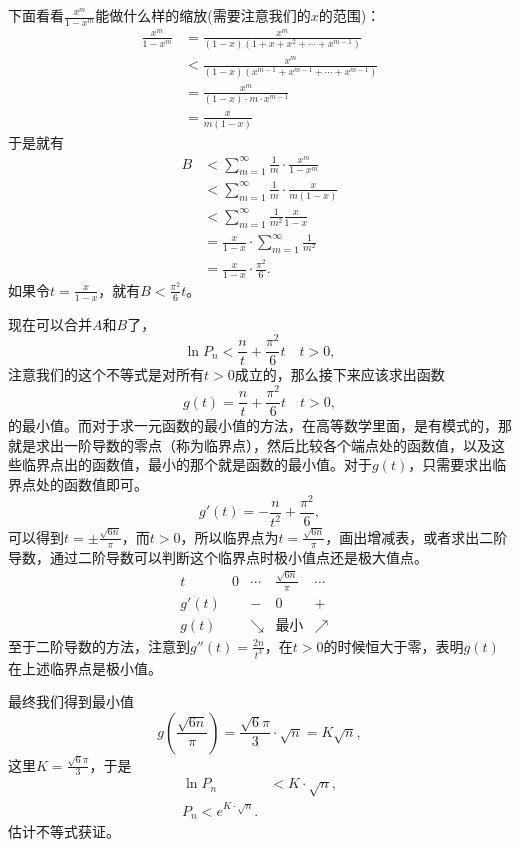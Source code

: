 \documentclass[cn]{elegantbook}
\begin{document}
下面看看$\frac{x^m}{1-x^m}$能做什么样的缩放(需要注意我们的$x$的范围)：
\[
\begin{aligned}
\frac{x^m}{1-x^m} &= \frac{x^m}{(1-x)(1+x+x^2+\cdots+x^{m-1})} \\
& < \frac{x^m}{(1-x)(x^{m-1} + x^{m-1} + \cdots + x^{m-1})} \\
&= \frac{x^m}{(1-x)\cdot m \cdot x^{m-1}} \\
&= \frac{x}{m(1-x)}
\end{aligned}
\]
于是就有
\[
\begin{aligned}
B &< \sum_{m=1}^{\infty}{\frac{1}{m} \cdot \frac{x^m}{1 - x^m}} \\
& < \sum_{m=1}^{\infty}{\frac{1}{m} \cdot \frac{x}{m(1-x)}}\\
& < \sum_{m=1}^{\infty}{\frac{1}{m^2}\frac{x}{1-x}} \\
&= \frac{x}{1-x} \cdot \sum_{m=1}^{\infty}{\frac{1}{m^2}} \\
&= \frac{x}{1-x} \cdot \frac{\pi^2}{6}.
\end{aligned}
\]
如果令$t = \frac{x}{1-x}$，就有$B < \frac{\pi^2}{6}t$。

现在可以合并$A$和$B$了，
\[
\ln{P_n} < \frac{n}{t} + \frac{\pi^2}{6}t \quad t > 0,
\]
注意我们的这个不等式是对所有$t > 0$成立的，那么接下来应该求出函数
\[
g(t) = \frac{n}{t} + \frac{\pi^2}{6}t \quad t > 0,
\]
的最小值。而对于求一元函数的最小值的方法，在高等数学里面，是有模式的，那就是求出一阶导数的零点（称为临界点），然后比较各个端点处的函数值，以及这些临界点出的函数值，最小的那个就是函数的最小值。对于$g(t)$，只需要求出临界点处的函数值即可。
\[
g'(t) = -\frac{n}{t^2} + \frac{\pi^2}{6},
\]
可以得到$t = \pm\frac{\sqrt{6n}}{\pi}$，而$t > 0$，所以临界点为$t = \frac{\sqrt{6n}}{\pi}$，画出增减表，或者求出二阶导数，通过二阶导数可以判断这个临界点时极小值点还是极大值点。
\[
\begin{array}{c||c|c|c|c|c}
t & 0 & \cdots & \frac{\sqrt{6n}}{\pi} & \cdots & \\
\hline
g'(t)&&-&0&+&\\
g(t)&&\searrow&\text{最小}&\nearrow&
\end{array}
\]
至于二阶导数的方法，注意到$g''(t) = \frac{2n}{t^3}$，在$t>0$的时候恒大于零，表明$g(t)$在上述临界点是极小值。


最终我们得到最小值
\[
g(\frac{\sqrt{6n}}{\pi}) = \frac{\sqrt{6}\pi}{3} \cdot \sqrt{n} = K \sqrt{n},
\]
这里$K = \frac{\sqrt{6}\pi}{3}$，于是
\[
\begin{aligned}
\ln{P_n} &< K \cdot \sqrt{n}, \\
P_n < e^{K \cdot \sqrt{n}}.
\end{aligned}
\]
估计不等式获证。
\end{document}
